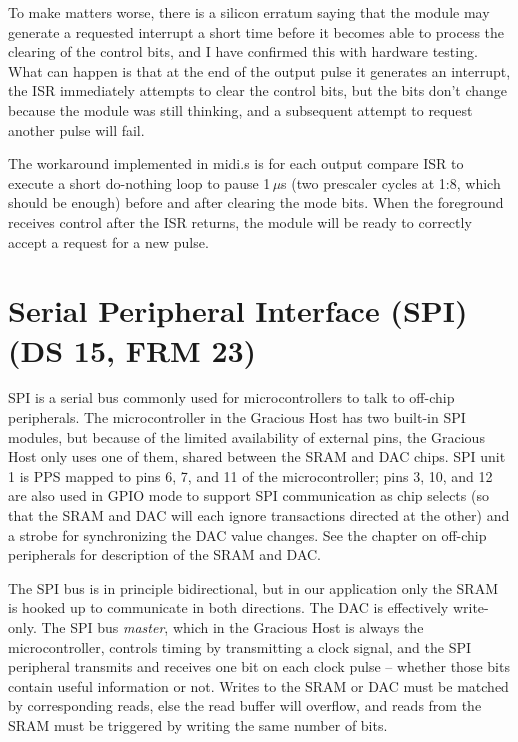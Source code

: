 To make matters worse, there is a silicon erratum saying that the module may
generate a requested interrupt a short time before it becomes able to
process the clearing of the control bits, and I have confirmed this with
hardware testing.  What can happen is that at the end of the output pulse it
generates an interrupt, the ISR immediately attempts to clear the control
bits, but the bits don't change because the module was still thinking, and a
subsequent attempt to request another pulse will fail.

The workaround implemented in midi.s is for each output compare ISR to
execute a short do-nothing loop to pause 1\,$\mu$s (two prescaler cycles at
1:8, which should be enough) before and after clearing the mode bits.  When
the foreground receives control after the ISR returns, the module will be
ready to correctly accept a request for a new pulse.


\section{Serial Peripheral Interface (SPI) (DS 15, FRM 23)}

SPI is a serial bus commonly used for microcontrollers to
talk to off-chip peripherals.  The microcontroller in the Gracious Host has
two built-in SPI modules, but because of the limited availability of
external pins, the Gracious Host only uses one of them, shared between the
SRAM and DAC chips.  SPI unit 1 is PPS mapped to pins 6, 7, and 11 of the
microcontroller; pins 3, 10, and 12 are also used in GPIO mode to support
SPI communication as chip selects (so that the SRAM and DAC will each ignore
transactions directed at the other) and a strobe for synchronizing the DAC
value changes.  See the chapter on off-chip peripherals for description of
the SRAM and DAC.

The SPI bus is in principle bidirectional, but in our application only the
SRAM is hooked up to communicate in both directions.  The DAC is effectively
write-only.  The SPI bus \emph{master}, which in the Gracious Host is
always the microcontroller, controls timing by transmitting a clock signal,
and the SPI peripheral transmits and receives one bit on each clock pulse --
whether those bits contain useful information or not.  Writes to the SRAM or
DAC must be matched by corresponding reads, else the read buffer will
overflow, and reads from the SRAM must be triggered by writing the same
number of bits.

